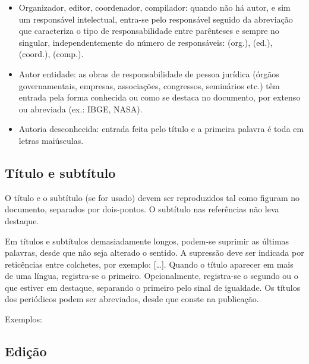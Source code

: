 \begin{itemize}
  \item Organizador, editor, coordenador, compilador: quando não há autor, e sim um responsável intelectual, entra-se pelo responsável seguido da abreviação que caracteriza o tipo de responsabilidade entre parênteses e sempre no singular, independentemente do número de responsáveis: (org.), (ed.), (coord.), (comp.).
  \item Autor entidade: as obras de responsabilidade de pessoa jurídica (órgãos governamentais, empresas, associações, congressos, seminários etc.) têm entrada pela forma conhecida ou como se destaca no documento, por extenso ou abreviada (ex.: IBGE, NASA).
  \item Autoria desconhecida: entrada feita pelo título e a primeira palavra é toda em letras maiúsculas.
\end{itemize}





\subsection{Título e subtítulo}

O título e o subtítulo (se for usado) devem ser reproduzidos tal como figuram no documento, separados por dois-pontos. O subtítulo nas referências não leva destaque.

Em títulos e subtítulos demasiadamente longos, podem-se suprimir as últimas palavras, desde que não seja alterado o sentido. A supressão deve ser indicada por reticências entre colchetes, por exemplo: [\ldots]. Quando o título aparecer em mais de uma língua, registra-se o primeiro. Opcionalmente, registra-se o segundo ou o que estiver em destaque, separando o primeiro pelo sinal de igualdade. Os títulos dos periódicos podem ser abreviados, desde que conste na publicação.

Exemplos:





\subsection{Edição}

